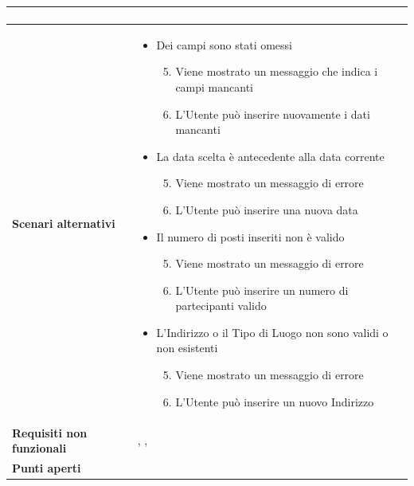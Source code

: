 \documentclass[12pt,a4paper]{report}
\let\oldhyperref\hyperref
\renewcommand{\hyperref}[2][]{\oldhyperref[#1]{\dotuline{#2}}}
\begin{document}
\begin{tabularx}{\textwidth}{|X|X|}
\begin{enumerate}[nosep, leftmargin=*]
        \end{enumerate} \\ \hline
    \textbf{Scenari alternativi} & 
        \begin{itemize}[nosep, leftmargin=*]
            \item Dei campi sono stati omessi
            \begin{enumerate}[nosep, leftmargin=*]
                \setcounter{enumi}{4}
                \item Viene mostrato un messaggio che indica i campi mancanti
                \item L'Utente può inserire nuovamente i dati mancanti
            \end{enumerate}
            \item La data scelta è antecedente alla data corrente
            \begin{enumerate}[nosep, leftmargin=*]
                \setcounter{enumi}{4}
                \item Viene mostrato un messaggio di errore
                \item L'Utente può inserire una nuova data
            \end{enumerate}
            \item Il numero di posti inseriti non è valido
            \begin{enumerate}[nosep, leftmargin=*]
                \setcounter{enumi}{4}
                \item Viene mostrato un messaggio di errore
                \item L'Utente può inserire un numero di partecipanti valido
            \end{enumerate}
            \item L'Indirizzo o il Tipo di Luogo non sono validi o non esistenti
            \begin{enumerate}[nosep, leftmargin=*]
                \setcounter{enumi}{4}
                \item Viene mostrato un messaggio di errore
                \item L'Utente può inserire un nuovo Indirizzo
            \end{enumerate}
        \end{itemize} \\ \hline
    \textbf{Requisiti non funzionali} & \hyperref[R04N]{R04N}, \hyperref[R05N]{R05N}, \hyperref[R07N]{R07N} \\ \hline
    \textbf{Punti aperti} & \\ \hline
\end{tabularx}
\end{document}
